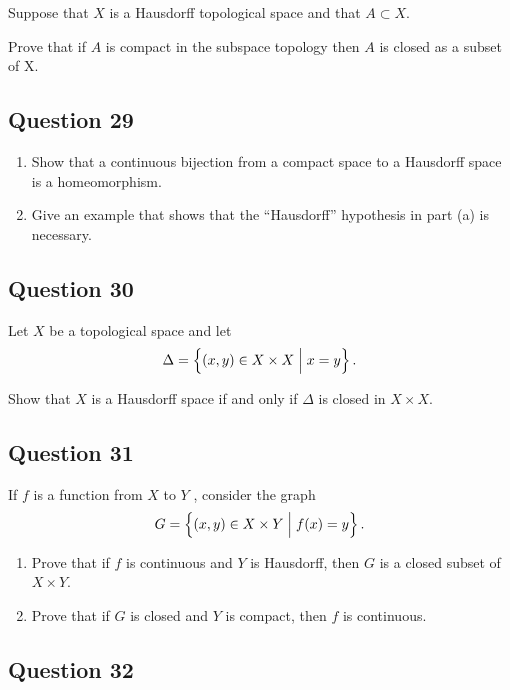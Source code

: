 \documentclass[12pt]{article}
\begin{document}
Suppose that \(X\) is a Hausdorff topological space and that
\(A \subset X\).

Prove that if \(A\) is compact in the subspace topology then \(A\) is
closed as a subset of X.

\hypertarget{question-29-3}{%
\subsection{Question 29}\label{question-29-3}}

\begin{enumerate}
\def\labelenumi{\alph{enumi}.}
\item
  Show that a continuous bijection from a compact space to a Hausdorff
  space is a homeomorphism.
\item
  Give an example that shows that the ``Hausdorff'' hypothesis in part
  (a) is necessary.
\end{enumerate}

\hypertarget{question-30-3}{%
\subsection{Question 30}\label{question-30-3}}

Let \(X\) be a topological space and let \[
\Delta = \left\{{(x, y) \in X \times X \mathrel{\Big|} x = y}\right\}
.\]

Show that \(X\) is a Hausdorff space if and only if \(\Delta\) is closed
in \(X \times X\).

\hypertarget{question-31-3}{%
\subsection{Question 31}\label{question-31-3}}

If \(f\) is a function from \(X\) to \(Y\) , consider the graph \[
G = \left\{{(x, y) \in X \times Y \mathrel{\Big|} f (x) = y}\right\}
.\]

\begin{enumerate}
\def\labelenumi{\alph{enumi}.}
\item
  Prove that if \(f\) is continuous and \(Y\) is Hausdorff, then \(G\)
  is a closed subset of \(X \times Y\).
\item
  Prove that if \(G\) is closed and \(Y\) is compact, then \(f\) is
  continuous.
\end{enumerate}

\hypertarget{question-32-3}{%
\subsection{Question 32}\label{question-32-3}}
\end{document}

